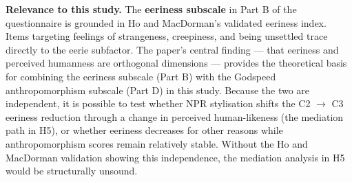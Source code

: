 \documentclass[11pt, a4paper]{article}
\begin{document}
\textbf{Relevance to this study.} The \textbf{eeriness subscale} in Part B of the questionnaire is grounded in Ho and MacDorman's validated eeriness index. Items targeting feelings of strangeness, creepiness, and being unsettled trace directly to the eerie subfactor. The paper's central finding --- that eeriness and perceived humanness are orthogonal dimensions --- provides the theoretical basis for combining the eeriness subscale (Part B) with the Godspeed anthropomorphism subscale (Part D) in this study. Because the two are independent, it is possible to test whether NPR stylisation shifts the C2 $\to$ C3 eeriness reduction through a change in perceived human-likeness (the mediation path in H5), or whether eeriness decreases for other reasons while anthropomorphism scores remain relatively stable. Without the Ho and MacDorman validation showing this independence, the mediation analysis in H5 would be structurally unsound.
\end{document}
